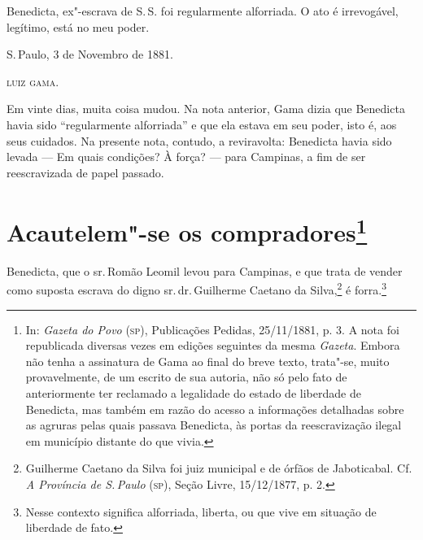 Benedicta, ex"-escrava de S.\,S. foi regularmente alforriada. O ato é
irrevogável, legítimo, está no meu poder.

S.\,Paulo, 3 de Novembro de 1881.

\textsc{luiz gama.}

\pagebreak
\mbox{}\vfill
\thispagestyle{empty}

{\small\noindent
Em vinte dias, muita coisa mudou. Na nota anterior, Gama dizia que
Benedicta havia sido ``regularmente alforriada'' e que ela estava em seu
poder, isto é, aos seus cuidados. Na presente nota, contudo, a
reviravolta: Benedicta havia sido levada --- Em quais condições? À força?
--- para Campinas, a fim de ser reescravizada de papel passado.}

\chapter{Acautelem"-se os compradores\footnote[*]{In: \emph{Gazeta do Povo} (\textsc{sp}), Publicações
  Pedidas, 25/11/1881, p. 3. A nota foi republicada diversas vezes em
  edições seguintes da mesma \emph{Gazeta}. Embora não tenha a
  assinatura de Gama ao final do breve texto, trata"-se, muito
  provavelmente, de um escrito de sua autoria, não só pelo fato de
  anteriormente ter reclamado a legalidade do estado de liberdade de
  Benedicta, mas também em razão do acesso a informações detalhadas
  sobre as agruras pelas quais passava Benedicta, às portas da
  reescravização ilegal em município distante do que vivia.}}

Benedicta, que o sr.\,Romão Leomil levou para Campinas, e que trata de
vender como suposta escrava do digno sr.\,dr.\,Guilherme Caetano da
Silva,\footnote{Guilherme Caetano da Silva foi juiz municipal e de
  órfãos de Jaboticabal. Cf. \emph{A Província de S.\,Paulo} (\textsc{sp}), Seção
  Livre, 15/12/1877, p. 2.} é forra.\footnote{Nesse contexto significa
  alforriada, liberta, ou que vive em situação de liberdade de fato.}

\pagebreak
\mbox{}\vfill
\thispagestyle{empty}

